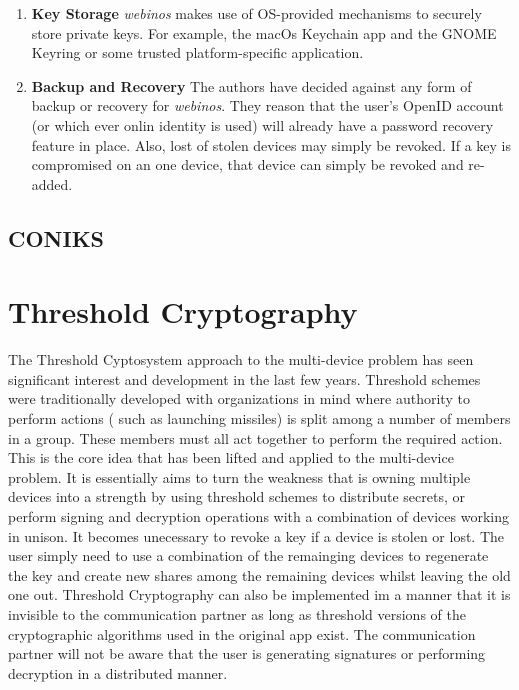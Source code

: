 \begin{enumerate}[label=\arabic*., wide, labelwidth=!, labelindent=0pt]
	\item \textbf{Key Storage} \textit{webinos} makes use of OS-provided mechanisms to securely store private keys. For example, the  							macOs Keychain app and the GNOME Keyring or some trusted platform-specific application. \\
	
	\item \textbf{Backup and Recovery} The authors have decided against any form of backup or recovery for \textit{webinos}. They reason that 			the user's OpenID account (or which ever onlin identity is used) will already have a password recovery feature in place. Also, lost of stolen 					devices may simply be revoked. If a key is compromised on an one device, that device can simply be revoked and re-added.\\

\end{enumerate}

\subsection{CONIKS}

\section{Threshold Cryptography}

The Threshold Cyptosystem approach to the multi-device problem has seen significant interest and development in the last few years. Threshold schemes were traditionally developed with organizations in mind where authority to perform actions ( such as launching missiles) is split among a number of members in a group. These members must all act together to perform the required action. This is the core idea that has been lifted and applied to the multi-device problem. It is essentially aims to turn the weakness that is owning multiple devices into a strength by using threshold schemes to distribute secrets, or perform signing and decryption operations with a combination of devices working in unison\cite{Desmedt2001, Atwater2016}. It becomes unecessary to revoke a key if a device is stolen or lost. The user simply need to use a combination of the remainging devices to regenerate the key and create new shares among the remaining devices whilst leaving the old one out. Threshold Cryptography can also be implemented im a manner that it is invisible to the communication partner as long as threshold versions of the cryptographic algorithms used in the original app exist. The communication partner will not be aware that the user is generating signatures or performing decryption in a distributed manner.

